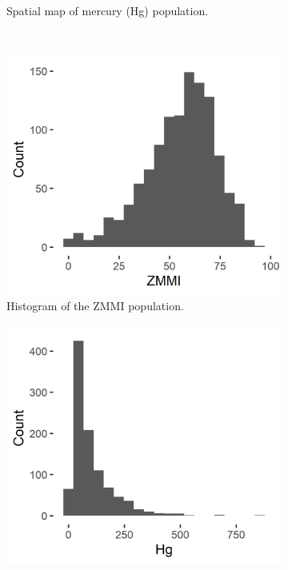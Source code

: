 \documentclass[]{elsarticle} %
\begin{document}
\begin{figure}
\begin{subfigure}{0.49\textwidth}
  \caption{Spatial map of mercury (Hg) population.}
  \label{fig:mercury_map}
\end{subfigure} \\
\begin{subfigure}{0.49\textwidth}
  \centering
  \includegraphics[width = 1\linewidth]{figures/zmmi_hist.jpeg}
  \caption{Histogram of the ZMMI population.}
  \label{fig:zmmi_hist}
\end{subfigure}
\begin{subfigure}{0.49\textwidth}
  \centering
  \includegraphics[width = 1\linewidth]{figures/mercury_hist.jpeg}

\end{subfigure}
\end{figure}
\end{document}
